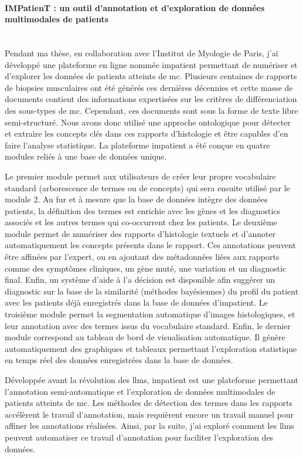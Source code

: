 \paragraph{\textbf{IMPatienT : un outil d’annotation et d’exploration de données multimodales de patients}}\mbox{}\\

Pendant ma thèse, en collaboration avec l’Institut de Myologie de Paris, j’ai développé une plateforme en ligne nommée \gls{impatient} permettant de numériser et d’explorer les données de patients atteints de \gls{mc}. Plusieurs centaines de rapports de biopsies musculaires ont été générés ces dernières décennies et cette masse de documents contient des informations expertisées sur les critères de différenciation des sous-types de \gls{mc}. Cependant, ces documents sont sous la forme de texte libre semi-structuré. Nous avons donc utilisé une approche ontologique pour détecter et extraire les concepts clés dans ces rapports d’histologie et être capables d’en faire l’analyse statistique. La plateforme \gls{impatient} a été conçue en quatre modules reliés à une base de données unique. 

Le premier module permet aux utilisateurs de créer leur propre vocabulaire standard (arborescence de termes ou de concepts) qui sera ensuite utilisé par le module 2. Au fur et à mesure que la base de données intègre des données patients, la définition des termes est enrichie avec les gènes et les diagnostics associés et les autres termes qui co-occurrent chez les patients. Le deuxième module permet de numériser des rapports d’histologie textuels et d’annoter automatiquement les concepts présents dans le rapport. Ces annotations peuvent être affinées par l’expert, ou en ajoutant des métadonnées liées aux rapports comme des symptômes cliniques, un gène muté, une variation et un diagnostic final. Enfin, un système d’aide à l’a décision est disponible afin suggérer un diagnostic sur la base de la similarité (méthodes bayésiennes) du profil du patient avec les patients déjà enregistrés dans la base de données d’\gls{impatient}. Le troisième module permet la segmentation automatique d’images histologiques, et leur annotation avec des termes issus du vocabulaire standard. Enfin, le dernier module correspond au tableau de bord de visualisation automatique. Il génère automatiquement des graphiques et tableaux permettant l’exploration statistique en temps réel des données enregistrées dans la base de données. 

Développée avant la révolution des \gls{llms}, \gls{impatient} est une plateforme permettant l’annotation semi-automatique et l’exploration de données multimodales de patients atteints de \gls{mc}. Les méthodes de détection des termes dans les rapports accélèrent le travail d'annotation, mais requièrent encore un travail manuel pour affiner les annotations réalisées. Ainsi, par la suite, j'ai exploré comment les \gls{llms} peuvent automatiser ce travail d'annotation pour faciliter l'exploration des données.


